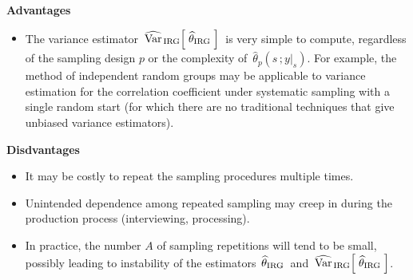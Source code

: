 \vskip 0.5cm
\noindent
\textbf{Advantages}
\begin{itemize}
\item
	The variance estimator
	\,$\widehat{\textnormal{Var}}_{\,\textnormal{IRG}}\!\left[\;\widehat{\theta}_{\textnormal{IRG}}\;\right]$\,
	is very simple to compute, regardless of the sampling design $p$ or
	the complexity of \,$\widehat{\theta}_{p}(s\,;y\vert_{s})$.
	For example, the method of independent random groups may be applicable to variance
	estimation for the correlation coefficient under systematic sampling with a single random start
	(for which there are no traditional techniques that give unbiased variance estimators).
\end{itemize}

\vskip 0.5cm
\noindent
\textbf{Disdvantages}
\begin{itemize}
\item
	It may be costly to repeat the sampling procedures multiple times.
\item
	Unintended dependence among repeated sampling may creep in during the production process
	(interviewing, processing).
\item
	In practice, the number $A$ of sampling repetitions will tend to be small,
	possibly leading to instability of the estimators
	\,$\widehat{\theta}_{\textnormal{IRG}}$\,
	and
	\,$\widehat{\textnormal{Var}}_{\,\textnormal{IRG}}\!\left[\;\widehat{\theta}_{\textnormal{IRG}}\;\right]$.
\end{itemize}

